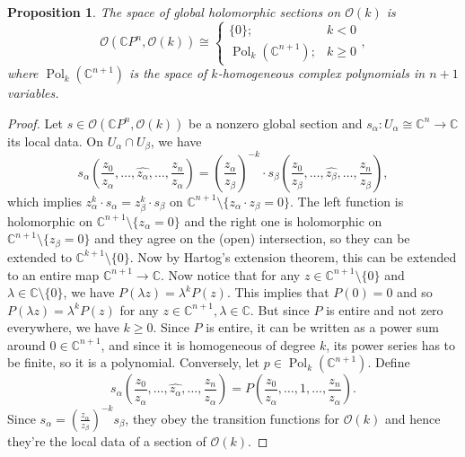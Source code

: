 \documentclass[10pt, a4paper]{article}
\newtheorem{proposition}[thm]{Proposition}
\newenvironment{noticeC}{%
  \tcolorbox[%
  notitle,
  empty,
  enhanced,  %
  breakable,
  coltext=black, 
  fontupper=\rmfamily,
  noparskip,
  sharp corners,
  boxrule=-1pt,  %
  frame hidden,
  left=7pt,  %
  right=7pt,
  top=5pt,
  bottom=5pt,
  before skip=2.5ex plus 2pt,
  after skip=2.5ex plus 2pt,
  overlay unbroken and last={%
  },
  ]}
{\endtcolorbox}
\newenvironment{myproof}%
  {\begin{noticeC}\begin{proof}}%
  {\end{proof}\end{noticeC}}
\newcommand{\C}{\mathbb {C}}
\DeclareMathOperator{\pol}{Pol}
\begin{document}
\begin{proposition}
  The space of global holomorphic sections on $\mathcal{O}(k)$ is 
  $$\mathcal{O} (\C P^n, \mathcal{O} (k)) \cong \begin{cases}
    \{0\}; & k < 0\\
    \pol_k (\C^{n + 1}); & k \geq 0
  \end{cases},$$
  where $\pol_k (\C^{n + 1})$ is the space of $k$-homogeneous complex polynomials in $n + 1$ variables.
\end{proposition}

\begin{myproof}
  Let $s \in \mathcal{O} (\C P^n, \mathcal{O} (k))$ be a nonzero global section and $s_\alpha: U_\alpha \cong \C^n \to \C$ its local data.
  On $U_\alpha \cap U_\beta$, we have 
  $$s_\alpha \left(\frac{z_0}{z_\alpha}, \dots, \widehat{z_\alpha}, \dots, \frac{z_n}{z_\alpha}\right) = \left(\frac{z_\alpha}{z_\beta}\right)^{-k} \cdot s_\beta \left(\frac{z_0}{z_\beta}, \dots, \widehat{z_\beta}, \dots, \frac{z_n}{z_\beta}\right),$$
  which implies $z_\alpha^k \cdot s_\alpha = z_\beta ^k \cdot s_\beta$ on $\C^{n + 1} \setminus \{z _\alpha \cdot z_\beta = 0 \}$.
  The left function is holomorphic on $\C ^{n + 1} \setminus \{ z_\alpha = 0\}$ and the right one is holomorphic on $\C ^{n + 1} \setminus \{ z_\beta = 0\}$ and they agree on the (open) intersection, so they can be extended to $\C^{k + 1} \setminus \{0\}$.
  Now by Hartog's extension theorem, this can be extended to an entire map $\C^{n + 1} \to \C$.
  Now notice that for any $z \in \C^{n + 1} \setminus \{0\}$ and $\lambda \in \C \setminus \{0\}$, we have $P(\lambda z) = \lambda^k P(z)$.
  This implies that $P(0) = 0$ and so $P(\lambda z) = \lambda^k P(z)$ for any $z \in \C ^{n + 1}, \lambda \in \C$.
  But since $P$ is entire and not zero everywhere, we have $k \geq 0$.
  Since $P$ is entire, it can be written as a power sum around $0 \in \C^{n + 1}$, and since it is homogeneous of degree $k$,
  its power series has to be finite, so it is a polynomial.
  Conversely, let $p \in \pol_k (\C^{n + 1})$. Define 
  $$s_\alpha \left(\frac{z_0}{z_\alpha}, \dots, \widehat{z_\alpha}, \dots, \frac{z_n}{z_\alpha}\right) = P \left(\frac{z_0}{z_\alpha}, \dots, 1, \dots, \frac{z_n}{z_\alpha}\right).$$
  Since $s_\alpha = \left(\frac{z_\alpha}{z_\beta}\right)^{-k} s_\beta$, 
  they obey the transition functions for $\mathcal{O}(k)$ and hence they're the local data of a section of $\mathcal{O}(k)$.
\end{myproof}
\end{document}
